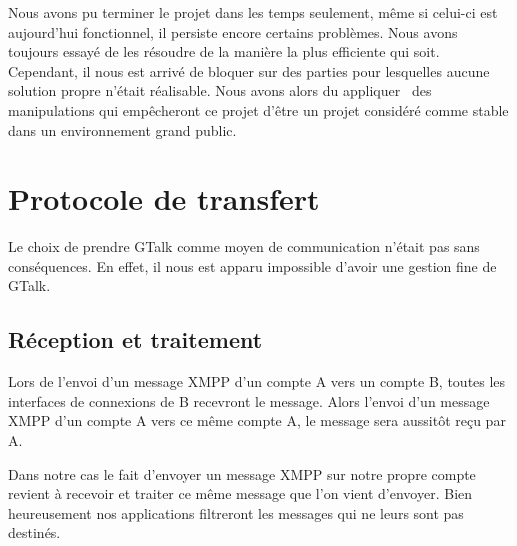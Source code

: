 Nous avons pu terminer le projet dans les temps seulement, même si celui-ci est aujourd'hui fonctionnel, il persiste encore certains problèmes. Nous avons toujours essayé de les
résoudre de la manière la plus efficiente qui soit. Cependant, il nous est arrivé de bloquer sur des
parties pour lesquelles aucune solution propre n'était réalisable. Nous avons alors du appliquer 
des manipulations qui empêcheront ce projet d'être un projet considéré comme stable dans un environnement
grand public.






\section{Protocole de transfert}

Le choix de prendre GTalk comme moyen de communication n'était pas sans conséquences.
En effet, il nous est apparu impossible d'avoir une gestion fine de GTalk.




\subsection{Réception et traitement}

Lors de l'envoi d'un message XMPP d'un compte A vers un compte B, toutes les interfaces de connexions de B recevront le message.
Alors l'envoi d'un message XMPP d'un compte A vers ce même compte A, le message sera aussitôt reçu par A.

Dans notre cas le fait d'envoyer un message XMPP sur notre propre compte revient à recevoir et traiter ce même message que l'on vient d'envoyer.
Bien heureusement nos applications filtreront les messages qui ne leurs sont pas destinés.

